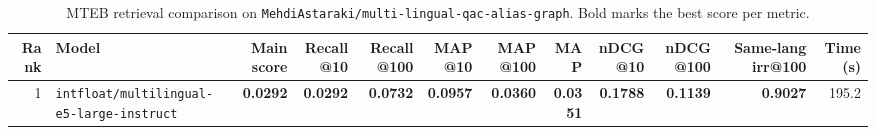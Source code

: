 \begin{table}[t]
\centering
\small
\begin{tabular}{r l r r r r r r r r r r}
\hline
Rank & Model & Main score & Recall@10 & Recall@100 & MAP@10 & MAP@100 & MAP & nDCG@10 & nDCG@100 & Same-lang irr@100 & Time (s) \\
\hline
1 & \texttt{intfloat/multilingual-e5-large-instruct} & \textbf{0.0292} & \textbf{0.0292} & \textbf{0.0732} & \textbf{0.0957} & \textbf{0.0360} & \textbf{0.0351} & \textbf{0.1788} & \textbf{0.1139} & \textbf{0.9027} & 195.2 \\
\hline
\end{tabular}
\caption{MTEB retrieval comparison on \texttt{MehdiAstaraki/multi-lingual-qac-alias-graph}. Bold marks the best score per metric.}
\label{tab:mteb-model-comparison}
\end{table}
